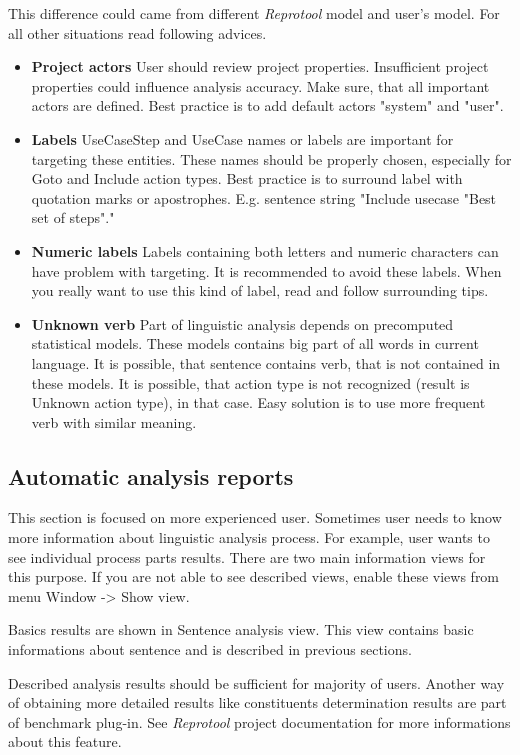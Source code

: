 This difference could came from different \emph{Reprotool} model and user's model. For all other situations read following advices.
\begin{itemize}
\item {\bf Project actors} User should review project properties. Insufficient project properties could influence analysis accuracy. Make sure, that all important actors are defined. Best practice is to add default actors "system" and "user".
 
\item {\bf Labels} UseCaseStep and UseCase names or labels are important for targeting these entities. These names should be properly chosen, especially for Goto and Include action types. Best practice is to surround label with quotation marks or apostrophes. E.g. sentence string "Include usecase "Best set of steps"."

\item {\bf Numeric labels} Labels containing both letters and numeric characters can have problem with targeting. It is recommended to avoid these labels. When you really want to use this kind of label, read and follow surrounding tips.

\item {\bf Unknown verb} Part of linguistic analysis depends on precomputed statistical models. These models contains big part of all words in current language. It is possible, that sentence contains verb, that is not contained in these models. It is possible, that action type is not recognized (result is Unknown action type), in that case. Easy solution is to use more frequent verb with similar meaning.
\end{itemize}

\subsection{Automatic analysis reports}
This section is focused on more experienced user. Sometimes user needs to know more information about linguistic analysis process. For example, user wants to see individual process parts results. There are two main information views for this purpose. If you are not able to see described views, enable these views from menu Window -> Show view. 

Basics results are shown in Sentence analysis view. This view contains basic informations about sentence and is described in previous sections.

Described analysis results should be sufficient for majority of users. Another way of obtaining more detailed results like constituents determination results are part of benchmark plug-in. See \emph{Reprotool} project documentation for more informations about this feature.

